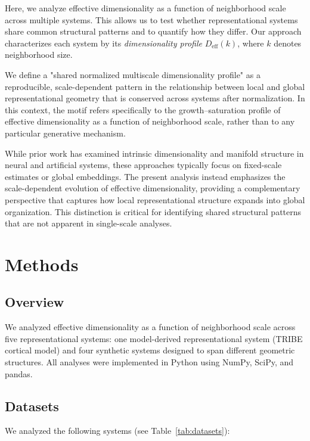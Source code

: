 Here, we analyze effective dimensionality as a function of neighborhood scale across multiple systems. This allows us to test whether representational systems share common structural patterns and to quantify how they differ. Our approach characterizes each system by its \emph{dimensionality profile} $D_{\mathrm{eff}}(k)$, where $k$ denotes neighborhood size.

We define a "shared normalized multiscale dimensionality profile" as a reproducible, scale-dependent pattern in the relationship between local and global representational geometry that is conserved across systems after normalization. In this context, the motif refers specifically to the growth--saturation profile of effective dimensionality as a function of neighborhood scale, rather than to any particular generative mechanism.

While prior work has examined intrinsic dimensionality and manifold structure in neural and artificial systems, these approaches typically focus on fixed-scale estimates or global embeddings. The present analysis instead emphasizes the scale-dependent evolution of effective dimensionality, providing a complementary perspective that captures how local representational structure expands into global organization. This distinction is critical for identifying shared structural patterns that are not apparent in single-scale analyses.

\section{Methods}

\subsection{Overview}

We analyzed effective dimensionality as a function of neighborhood scale across five representational systems: one model-derived representational system (TRIBE cortical model) and four synthetic systems designed to span different geometric structures. All analyses were implemented in Python using NumPy, SciPy, and pandas.

\subsection{Datasets}

We analyzed the following systems (see Table~\ref{tab:datasets}):

